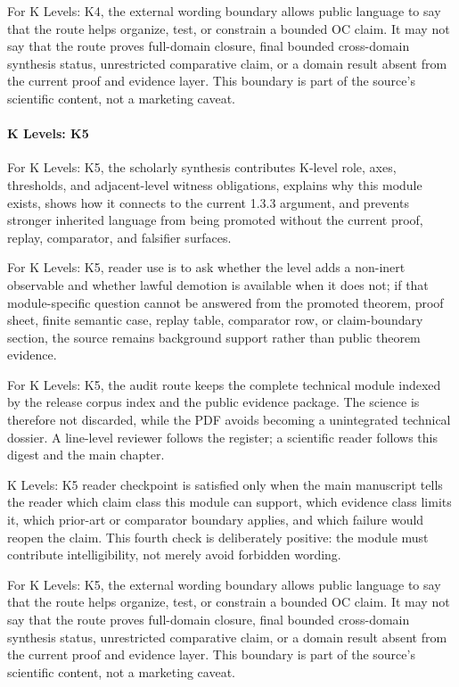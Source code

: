 For K Levels: K4, the external wording boundary allows public language to say that the route helps organize, test, or constrain a bounded OC claim. It may not say that the route proves full-domain closure, final bounded cross-domain synthesis status, unrestricted comparative claim, or a domain result absent from the current proof and evidence layer. This boundary is part of the source's scientific content, not a marketing caveat.


\paragraph{K Levels: K5}

For K Levels: K5, the scholarly synthesis contributes K-level role, axes, thresholds, and adjacent-level witness obligations, explains why this module exists, shows how it connects to the current 1.3.3 argument, and prevents stronger inherited language from being promoted without the current proof, replay, comparator, and falsifier surfaces.


For K Levels: K5, reader use is to ask whether the level adds a non-inert observable and whether lawful demotion is available when it does not; if that module-specific question cannot be answered from the promoted theorem, proof sheet, finite semantic case, replay table, comparator row, or claim-boundary section, the source remains background support rather than public theorem evidence.


For K Levels: K5, the audit route keeps the complete technical module indexed by the release corpus index and the public evidence package. The science is therefore not discarded, while the PDF avoids becoming a unintegrated technical dossier. A line-level reviewer follows the register; a scientific reader follows this digest and the main chapter.


K Levels: K5 reader checkpoint is satisfied only when the main manuscript tells the reader which claim class this module can support, which evidence class limits it, which prior-art or comparator boundary applies, and which failure would reopen the claim. This fourth check is deliberately positive: the module must contribute intelligibility, not merely avoid forbidden wording.


For K Levels: K5, the external wording boundary allows public language to say that the route helps organize, test, or constrain a bounded OC claim. It may not say that the route proves full-domain closure, final bounded cross-domain synthesis status, unrestricted comparative claim, or a domain result absent from the current proof and evidence layer. This boundary is part of the source's scientific content, not a marketing caveat.


